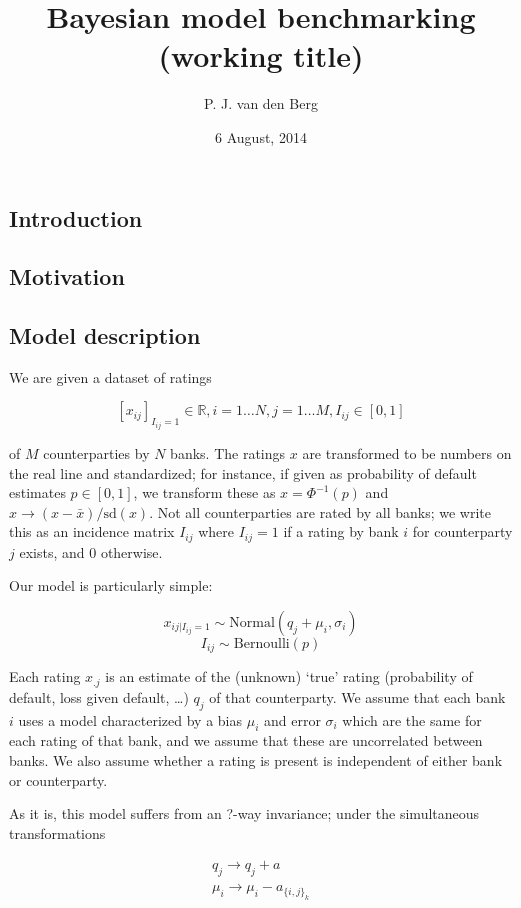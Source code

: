 \documentclass[]{article}
\title{Bayesian model benchmarking (working title)}
\author{P. J. van den Berg}
\date{6 August, 2014}
\begin{document}
\maketitle

\subsection{Introduction}\label{introduction}

\subsection{Motivation}\label{motivation}

\subsection{Model description}\label{model-description}

We are given a dataset of ratings

\[\left[ x_{ij}\right]_{I_{ij}=1}\in\mathbb{R}, i=1\dots N,j=1\dots M, I_{ij} \in [0,1]\]

of $M$ counterparties by $N$ banks. The ratings $x$ are transformed to
be numbers on the real line and standardized; for instance, if given as
probability of default estimates $p\in[0,1]$, we transform these as
$x=\Phi^{-1}(p)$ and $x\to(x - \bar{x}) / \mathrm{sd}(x)$. Not all
counterparties are rated by all banks; we write this as an incidence
matrix $I_{ij}$ where $I_{ij}=1$ if a rating by bank $i$ for
counterparty $j$ exists, and $0$ otherwise.

Our model is particularly simple:

\[ x_{ij|I_{ij}=1}  \sim  \mathrm {Normal} (q_{j} + \mu_{i},\sigma_i ) \]
\[ I_{ij}  \sim \mathrm{Bernoulli}(p) \]

Each rating $x_{.j}$ is an estimate of the (unknown) `true' rating
(probability of default, loss given default, \ldots{}) $q_j$ of that
counterparty. We assume that each bank $i$ uses a model characterized by
a bias $\mu_i$ and error $\sigma_i$ which are the same for each rating
of that bank, and we assume that these are uncorrelated between banks.
We also assume whether a rating is present is independent of either bank
or counterparty.

As it is, this model suffers from an ?-way invariance; under the
simultaneous transformations

\[
\begin{matrix} q_j \to q_j+a \\ \mu_i\to\mu_i-a_{\{i,j\}_k} \end{matrix} 
\]
\end{document}
